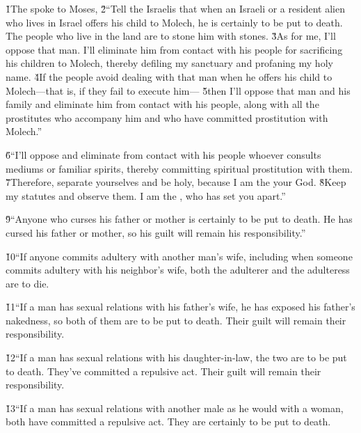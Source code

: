 \v{1}The  spoke to Moses, \v{2}``Tell the Israelis that when an Israeli or a resident alien who lives in Israel offers his child to Molech, he is certainly to be put to death. The people who live in the land are to stone him with stones. \v{3}As for me, I'll oppose that man. I'll eliminate him from contact with his people for sacrificing his children to Molech, thereby defiling my sanctuary and profaning my holy name. \v{4}If the people avoid dealing with that man when he offers his child to Molech---that is, if they fail to execute him--- \v{5}then I'll oppose that man and his family and eliminate him from contact with his people, along with all the prostitutes who accompany him and who have committed prostitution with Molech.''

\v{6}``I'll oppose and eliminate from contact with his people whoever consults mediums or familiar spirits, thereby committing spiritual prostitution with them. \v{7}Therefore, separate yourselves and be holy, because I am the  your God. \v{8}Keep my statutes and observe them. I am the , who has set you apart.''

\v{9}``Anyone who curses his father or mother is certainly to be put to death. He has cursed his father or mother, so his guilt will remain his responsibility.''

\v{10}``If anyone commits adultery with another man's wife, including when someone commits adultery with his neighbor's wife, both the adulterer and the adulteress are to die.

\v{11}``If a man has sexual relations with his father's wife, he has exposed his father's nakedness, so both of them are to be put to death. Their guilt will remain their responsibility.

\v{12}``If a man has sexual relations with his daughter-in-law, the two are to be put to death. They've committed a repulsive act. Their guilt will remain their responsibility.

\v{13}``If a man has sexual relations with another male as he would with a woman, both have committed a repulsive act. They are certainly to be put to death.

